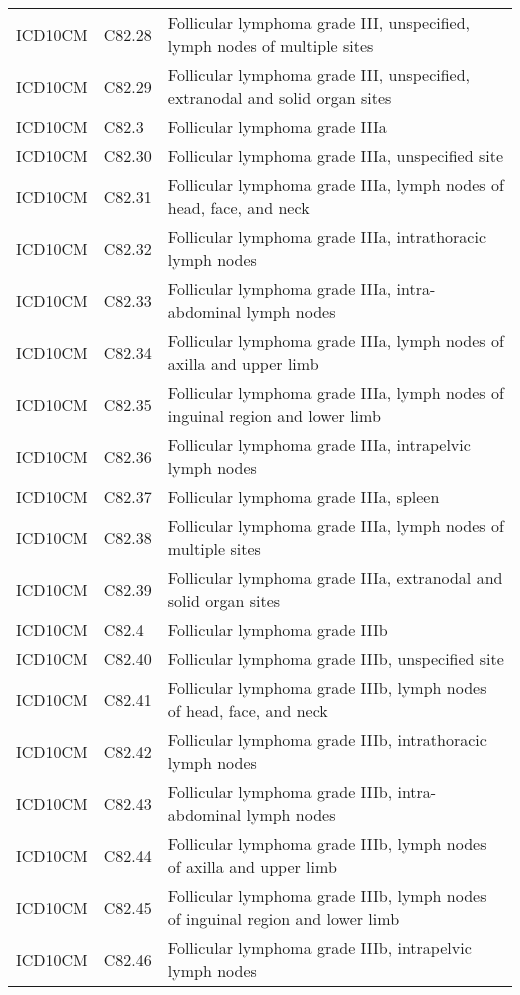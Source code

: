 \begin{longtable}{p{}p{}p{}}
  ICD10CM & C82.28 & Follicular lymphoma grade III, unspecified, lymph nodes of multiple sites \\ 
  ICD10CM & C82.29 & Follicular lymphoma grade III, unspecified, extranodal and solid organ sites \\ 
  ICD10CM & C82.3 & Follicular lymphoma grade IIIa \\ 
  ICD10CM & C82.30 & Follicular lymphoma grade IIIa, unspecified site \\ 
  ICD10CM & C82.31 & Follicular lymphoma grade IIIa, lymph nodes of head, face, and neck \\ 
  ICD10CM & C82.32 & Follicular lymphoma grade IIIa, intrathoracic lymph nodes \\ 
  ICD10CM & C82.33 & Follicular lymphoma grade IIIa, intra-abdominal lymph nodes \\ 
  ICD10CM & C82.34 & Follicular lymphoma grade IIIa, lymph nodes of axilla and upper limb \\ 
  ICD10CM & C82.35 & Follicular lymphoma grade IIIa, lymph nodes of inguinal region and lower limb \\ 
  ICD10CM & C82.36 & Follicular lymphoma grade IIIa, intrapelvic lymph nodes \\ 
  ICD10CM & C82.37 & Follicular lymphoma grade IIIa, spleen \\ 
  ICD10CM & C82.38 & Follicular lymphoma grade IIIa, lymph nodes of multiple sites \\ 
  ICD10CM & C82.39 & Follicular lymphoma grade IIIa, extranodal and solid organ sites \\ 
  ICD10CM & C82.4 & Follicular lymphoma grade IIIb \\ 
  ICD10CM & C82.40 & Follicular lymphoma grade IIIb, unspecified site \\ 
  ICD10CM & C82.41 & Follicular lymphoma grade IIIb, lymph nodes of head, face, and neck \\ 
  ICD10CM & C82.42 & Follicular lymphoma grade IIIb, intrathoracic lymph nodes \\ 
  ICD10CM & C82.43 & Follicular lymphoma grade IIIb, intra-abdominal lymph nodes \\ 
  ICD10CM & C82.44 & Follicular lymphoma grade IIIb, lymph nodes of axilla and upper limb \\ 
  ICD10CM & C82.45 & Follicular lymphoma grade IIIb, lymph nodes of inguinal region and lower limb \\ 
  ICD10CM & C82.46 & Follicular lymphoma grade IIIb, intrapelvic lymph nodes \\ 

\end{longtable}
